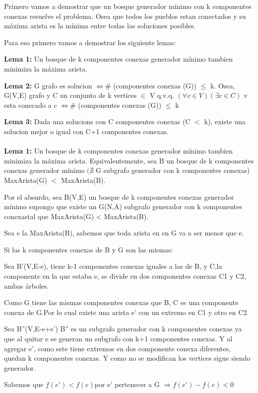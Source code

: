 Primero vamos a demostrar que un bosque generador mínimo con k componentes conexas resuelve el problema. Osea que todos los pueblos estan conectados y su máxima arista es la mínima entre todas las soluciones posibles.

Para eso primero vamos a demostrar los siguiente lemas:

\textbf{Lema 1:} Un bosque de k componentes conexas generador mínimo tambien minimiza la máxima arista.

\textbf{Lema 2:} G grafo es solucion $\Leftrightarrow \#$ (componentes conexas (G)) $\leq$ k. Osea,  G(V,E) grafo y C un conjunto de k vertices $\in $ V q.v.q. $(\forall v \in V)(\exists c \in C)$ v esta conecado a c $\Leftrightarrow \#$ (componentes conexas (G)) $\leq$ k

\textbf{Lema 3:} Dada una solucions con C componentes conexas (C $<$ k), existe una solucion mejor o igual con C+1 componentes conexas. \\ \\ 


\textbf{Lema 1:} Un bosque de k componentes conexas generador mínimo tambien minimiza la máxima arista. Equivalentemente, sea B un bosque de k componentes conexas generador mínimo $(\nexists$ G subgrafo generador con k componentes conexas) MaxArista(G) $<$ MaxArista(B).

Por el absurdo, sea B(V,E) un bosque de k componentes conexas generador mínimo supongo que existe un G(N,A) subgrafo generador con k componentes conexastal que MaxArista(G) < MaxArista(B).

Sea e la MaxArista(B), sabemos que toda arista en en G va a ser menor que e.

Si las k componentes conexas de B y G son las mismas:

Sea B'(V,E-e), tiene k-1 componentes conexas iguales a las de B, y C,la componente en la que estaba e, se divide en dos componentes conexas C1 y C2, ambas árboles.

Como G tiene las mismas componentes conexas que B, C es una componente conexa de G.Por lo cual existe una arista e' con un extremo en C1 y otro en C2.

Sea B''(V,E-e+e') B'' es un subgrafo generador con k componentes conexas ya que al quitar e se generan un subgrafo con k+1 componentes conexas. Y al agregar e', como este  tiene extremos en dos componente conexa diferentes, quedan k componentes conexas. Y como no se modifican los vertices sigue siendo generador.

Sabemos que $f(e') < f(e) $por e' pertenecer a G $\Rightarrow f(e') - f(e) < 0$

